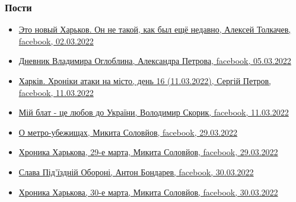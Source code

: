  
 
 
 
 

\subsubsection{Пости}


\begin{itemize} %

\item \hyperlink{02_03_2022.fb.tolkachev_aleksej.1.novyj_harkov}{
Это новый Харьков. Он не такой, как был ещё недавно, Алексей Толкачев, facebook, 02.03.2022%
}

\item \hyperlink{05_03_2022.fb.petrova_aleksandra.1.dnevnik_ogloblin}{%
Дневник Владимира Оглоблина, Александра Петрова, facebook, 05.03.2022%
}

\item \hyperlink{11_03_2022.fb.petrov_sergij.harkiv.1.hroniki}{%
Харків. Хроніки атаки на місто, день 16 (11.03.2022), Сергій Петров, facebook, 11.03.2022%
}

\item \hyperlink{11_03_2022.fb.skoryk_volodymyr.harkiv.1.blat_lubov_do_ukrainy}{%
Мій блат - це любов до України, Володимир Скорик, facebook, 11.03.2022%
}

\item \hyperlink{29_03_2022.fb.solovjov_mikita.harkov.demsokyra.2.o_metro_ubezhischah}{%
О метро-убежищах, Микита Соловйов, facebook, 29.03.2022%
}

\item \hyperlink{29_03_2022.fb.solovjov_mikita.harkov.demsokyra.1.hronika}{%
Хроника Харькова, 29-е марта, Микита Соловйов, facebook, 29.03.2022%
}

\item \hyperlink{30_03_2022.fb.bondarev_anton.harkiv.1.slava_oboroni_podjezd}{%
Слава Під'їздній Обороні, Антон Бондарев, facebook, 30.03.2022%
}

\item \hyperlink{30_03_2022.fb.solovjov_mikita.harkov.demsokyra.1.hronika}{%
Хроника Харькова, 30-е марта, Микита Соловйов, facebook, 30.03.2022%
}


\end{itemize}
